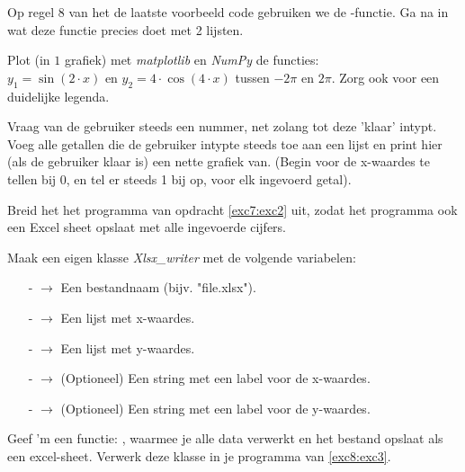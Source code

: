 \begin{exercise}
Op regel $8$ van het de laatste voorbeeld code gebruiken we de -functie. Ga na in wat deze functie precies doet met 2 lijsten. 
\end{exercise}

\begin{exercise}
Plot (in $1$ grafiek) met \textit{matplotlib} en \textit{NumPy} de functies: \\
$y_{1}=\sin(2\cdot x)$ en $y_{2}=4\cdot\cos(4\cdot x)$ tussen $-2\pi$ en $2\pi$. Zorg ook voor een duidelijke legenda.
\end{exercise}

\begin{exercise}
\label{exc7:exc2}
Vraag van de gebruiker steeds een nummer, net zolang tot deze 'klaar' intypt. \\
Voeg alle getallen die de gebruiker intypte steeds toe aan een lijst en print hier (als de gebruiker klaar is) een nette grafiek van. (Begin voor de x-waardes te tellen bij $0$, en tel er steeds 1 bij op, voor elk ingevoerd getal).
\end{exercise}

\begin{exercise}
\label{exc8:exc3}
Breid het het programma van opdracht \ref{exc7:exc2} uit, zodat het programma ook een Excel sheet opslaat met alle ingevoerde cijfers.
\end{exercise}

\begin{exercise}
Maak een eigen klasse \textit{Xlsx\_writer} met de volgende variabelen: 
\begin{itemize}
  \item[-]{   $\rightarrow$ Een bestandnaam (bijv. "file.xlsx").}
  \item[-]{ $\rightarrow$ Een lijst met x-waardes.}
  \item[-]{ $\rightarrow$ Een lijst met y-waardes.}
  \item[-]{   $\rightarrow$ (Optioneel) Een string met een label voor de x-waardes.}
  \item[-]{   $\rightarrow$ (Optioneel) Een string met een label voor de y-waardes.}
\end{itemize}

Geef 'm een functie: , waarmee je alle data verwerkt en het bestand opslaat als een excel-sheet. Verwerk deze klasse in je programma van \ref{exc8:exc3}.
\end{exercise}


